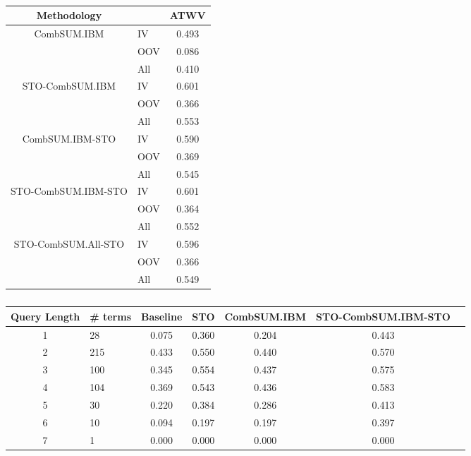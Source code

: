 \documentclass[a4paper,oneside,reqno]{amsart}
\begin{document}
\begin{table}[ht!]
  \begin{tabular}{clc}
    \toprule
    Methodology & & ATWV \\
    \midrule
    \multirow{3}{*}{CombSUM.IBM}         & IV  & 0.493 \\
                                         & OOV & 0.086 \\
                                         & All & 0.410 \\
    \multirow{3}{*}{STO-CombSUM.IBM}     & IV  & 0.601 \\
                                         & OOV & 0.366 \\
                                         & All & 0.553 \\
    \multirow{3}{*}{CombSUM.IBM-STO}     & IV  & 0.590 \\
                                         & OOV & 0.369 \\
                                         & All & 0.545 \\
    \multirow{3}{*}{STO-CombSUM.IBM-STO} & IV  & 0.601 \\
                                         & OOV & 0.364 \\
                                         & All & 0.552 \\

    \multirow{3}{*}{STO-CombSUM.All-STO} & IV  & 0.596 \\
                                         & OOV & 0.366 \\
                                         & All & 0.549 \\
    \bottomrule
  \end{tabular}
  \caption{}
  \label{tab:}
\end{table}

\begin{table}[ht!]
  \begin{tabular}{clccccc}
    \toprule
    Query Length & \# terms & Baseline & STO & CombSUM.IBM & STO-CombSUM.IBM-STO \\ %
    \midrule
    1 & 28  & 0.075 & 0.360 & 0.204 & 0.443 \\
    2 & 215 & 0.433 & 0.550 & 0.440 & 0.570 \\
    3 & 100 & 0.345 & 0.554 & 0.437 & 0.575 \\
    4 & 104 & 0.369 & 0.543 & 0.436 & 0.583 \\
    5 & 30  & 0.220 & 0.384 & 0.286 & 0.413 \\
    6 & 10  & 0.094 & 0.197 & 0.197 & 0.397 \\
    7 & 1   & 0.000 & 0.000 & 0.000 & 0.000 \\
    \bottomrule
  \end{tabular}
  \caption{}
  \label{tab:}
\end{table}
\end{document}
